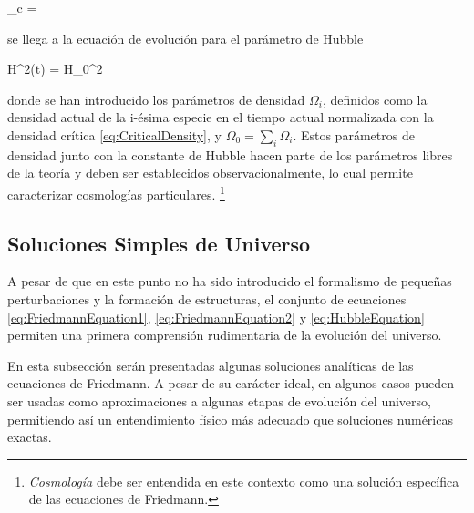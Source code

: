 { \rho_c =  }


se llega a la ecuación de evolución para el parámetro de Hubble


{ H^2(t) = H_0^2  }


donde se han introducido los parámetros de densidad $\Omega_i$, definidos 
como la densidad actual de la i-ésima especie en el tiempo actual 
normalizada con la densidad crítica \ref{eq:CriticalDensity}, y 
$\Omega_0 = \sum_i \Omega_i$. Estos parámetros de densidad junto con la 
constante de Hubble hacen parte de los parámetros libres de la teoría y 
deben ser establecidos observacionalmente, lo cual permite caracterizar 
cosmologías particulares. \footnote{\textit{Cosmología} debe ser 
entendida en este contexto como una solución específica de las ecuaciones 
de Friedmann.}


	\subsection{Soluciones Simples de Universo}
	\label{subsec:SimpleSolutionsOfTheUniverse}


A pesar de que en este punto no ha sido introducido el formalismo de 
pequeñas perturbaciones y la formación de estructuras, el conjunto de 
ecuaciones \ref{eq:FriedmannEquation1}, \ref{eq:FriedmannEquation2} y 
\ref{eq:HubbleEquation} permiten una primera comprensión rudimentaria de 
la evolución del universo.


En esta subsección serán presentadas algunas soluciones analíticas de las 
ecuaciones de Friedmann. A pesar de su carácter ideal, en algunos casos
pueden ser usadas como aproximaciones a algunas etapas de evolución del 
universo, permitiendo así un entendimiento físico más adecuado que 
soluciones numéricas exactas.


